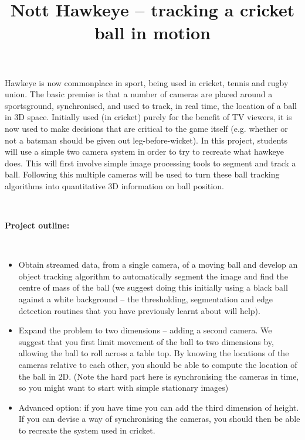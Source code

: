 \documentclass[11pt]{article}
\title{Nott Hawkeye – tracking a cricket ball in motion}
\date{}
\begin{document}
\maketitle

Hawkeye is now commonplace in sport, being used in cricket, tennis and rugby union. The basic premise is that a number of cameras are placed around a sportsground, synchronised, and used to track, in real time, the location of a ball in 3D space. Initially used (in cricket) purely for the benefit of TV viewers, it is now used to make decisions that are critical to the game itself (e.g. whether or not a batsman should be given
out leg-before-wicket).
In this project, students will use a simple two camera system in order to try to recreate what hawkeye does. This will first involve simple
image processing tools to segment and track a ball. Following this multiple cameras will be used to turn these ball tracking algorithms into quantitative 3D information on ball position.

\

\textbf{Project outline:}

\

\begin{itemize}
	\item Obtain streamed data, from a single camera, of a moving ball and develop an object tracking algorithm to automatically segment the image and find the centre of mass of the ball (we suggest doing this initially using a black ball against a white background – the thresholding, segmentation and edge detection routines that you have previously learnt about will help).
	\item Expand the problem to two dimensions – adding a second camera. We suggest that you first limit movement of the ball to two dimensions by, allowing the ball to roll across a table top. By knowing the locations of the cameras relative to each other, you should be able to compute the location of the ball in 2D. (Note the hard part here is synchronising the cameras in time, so you might want to start with simple stationary images)
	\item Advanced option: if you have time you can add the third dimension of height. If you can devise a way of synchronising the cameras, you should then be able to recreate the system used in cricket.

\end{itemize}
\end{document}
